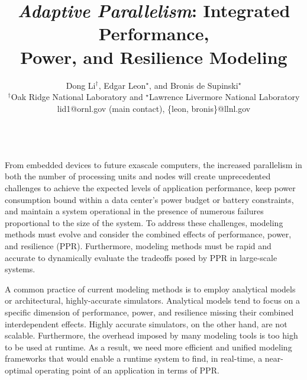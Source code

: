 \documentclass{article}  %
\begin{document}
\title{\emph{Adaptive Parallelism}: Integrated Performance, \\Power, and Resilience Modeling}


\author{Dong Li$^{\dag}$, Edgar Leon$^{\star}$, and Bronis de Supinski$^{\star}$ \\
    $^{\dag}$Oak Ridge National Laboratory and $^{\star}$Lawrence Livermore National Laboratory \\
    lid1@ornl.gov (main contact), \{leon, bronis\}@llnl.gov	\\
}

\date{}

\maketitle

\\
From embedded devices to future exascale computers, the increased
parallelism in both the number of processing units and nodes will
create unprecedented challenges to achieve the expected levels of
application performance, keep power consumption bound within a data
center's power budget or battery constraints, and maintain a system
operational in the presence of numerous failures proportional to the
size of the system. To address these challenges, modeling methods must
evolve and consider the combined effects of performance, power,
and resilience (PPR). Furthermore, modeling methods must be rapid and
accurate to dynamically evaluate the tradeoffs posed by PPR in
large-scale systems. 


A common practice of current modeling methods is to employ analytical
models or architectural, highly-accurate simulators. Analytical models
tend to focus on a specific dimension of performance, power, and
resilience missing their combined interdependent effects. Highly
accurate simulators, on the other hand, are not scalable. Furthermore,
the overhead imposed by many modeling tools is too high to be used at
runtime. As a result, we need more efficient and unified modeling
frameworks that would enable a runtime system to find, in real-time, a
near-optimal operating point of an application in terms of PPR. 
\end{document}
